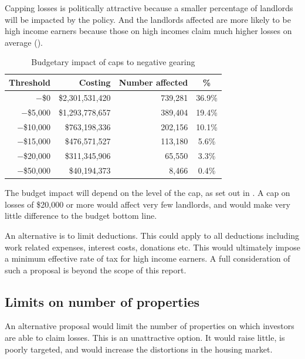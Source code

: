 \documentclass{grattan}\usepackage[]{graphicx}\usepackage[]{color}
\begin{document}
Capping losses is politically attractive because a smaller percentage of landlords will be impacted by the policy. And the landlords affected are more likely to be high income earners because those on high incomes claim much higher losses on average (). 

\begin{table}
\caption{Budgetary impact of caps to negative gearing}\label{tbl:cap-NG}
\begin{tabular}{rrrS}
  \toprule
{\textbf{Threshold}} & {\textbf{Costing}} & {\textbf{Number affected}} & {\textbf{\%}} \\ 
  \midrule
$-$\$0 & \$2,301,531,420 & 739,281 & 36.9\% \\ 
  $-$\$5,000 & \$1,293,778,657 & 389,404 & 19.4\% \\ 
  $-$\$10,000 & \$763,198,336 & 202,156 & 10.1\% \\ 
  $-$\$15,000 & \$476,571,527 & 113,180 & 5.6\% \\ 
  $-$\$20,000 & \$311,345,906 & 65,550 & 3.3\% \\ 
  $-$\$50,000 & \$40,194,373 & 8,466 & 0.4\% \\ 
   \bottomrule
\end{tabular}

\end{table}


The budget impact will depend on the level of the cap, as set out in . A cap on losses of \$20,000 or more would affect very few landlords, and would make very little difference to the budget bottom line.

An alternative is to limit deductions. This could apply to all deductions including work related expenses, interest costs, donations etc. This would ultimately impose a minimum effective rate of tax for high income earners.   A full consideration of such a proposal is beyond the scope of this report. 

\subsection{Limits on number of properties}
An alternative proposal would limit the number of properties on which investors are able to claim losses.  This is an unattractive option. It would raise little, is poorly targeted, and would increase the distortions in the housing market.
\end{document}

